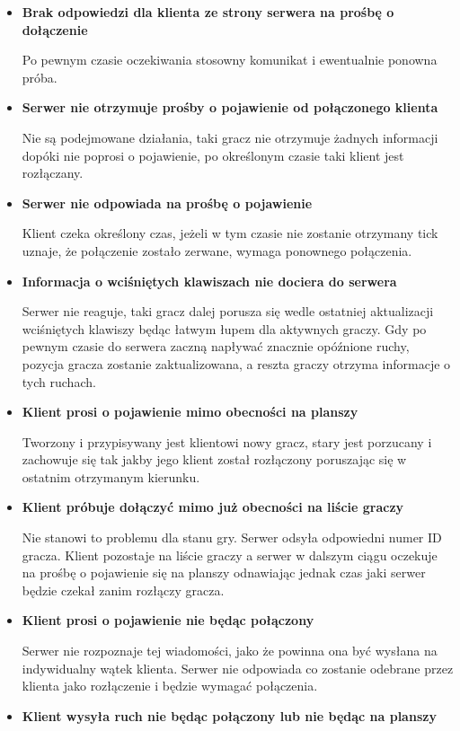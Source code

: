 \documentclass{article}
\begin{document}
\begin{itemize}
    \item  \textbf{Brak odpowiedzi dla klienta ze strony serwera na prośbę o dołączenie}
    
    Po pewnym czasie oczekiwania stosowny komunikat i ewentualnie ponowna próba.
    \item  \textbf{Serwer nie otrzymuje prośby o pojawienie od połączonego klienta}
    
    Nie są podejmowane działania, taki gracz nie otrzymuje żadnych informacji dopóki nie poprosi o pojawienie,
    po określonym czasie taki klient jest rozłączany.
    \item \textbf{Serwer nie odpowiada na prośbę o pojawienie}
    

    Klient czeka określony czas, jeżeli w tym czasie nie zostanie otrzymany tick uznaje, że połączenie zostało
    zerwane, wymaga ponownego połączenia.
    \item  \textbf{Informacja o wciśniętych klawiszach nie dociera do serwera}
    
    
    Serwer nie reaguje, taki gracz dalej porusza się wedle ostatniej aktualizacji wciśniętych klawiszy będąc
    łatwym łupem dla aktywnych graczy. Gdy po pewnym czasie do serwera zaczną napływać znacznie opóźnione ruchy, pozycja gracza zostanie zaktualizowana, a reszta graczy otrzyma informacje o tych ruchach.
    \item  \textbf{Klient prosi o pojawienie mimo obecności na planszy}
    
    Tworzony i przypisywany jest klientowi nowy gracz, stary jest porzucany i zachowuje się tak jakby jego
    klient został rozłączony poruszając się w ostatnim otrzymanym kierunku.
    \item \textbf{Klient próbuje dołączyć mimo już obecności na liście graczy}
    
    Nie stanowi to problemu dla stanu gry. Serwer odsyła odpowiedni numer ID gracza. Klient pozostaje na liście graczy a serwer w dalszym ciągu oczekuje na prośbę o
    pojawienie się na planszy odnawiając jednak czas jaki serwer będzie czekał zanim rozłączy gracza.
    \item \textbf{Klient prosi o pojawienie nie będąc połączony}
    
    Serwer nie rozpoznaje tej wiadomości, jako że powinna ona być wysłana na indywidualny wątek klienta. Serwer nie odpowiada co zostanie odebrane przez klienta jako rozłączenie i będzie wymagać połączenia.
    \item \textbf{Klient wysyła ruch nie będąc połączony lub nie będąc na planszy}
    

\end{itemize}
\end{document}
